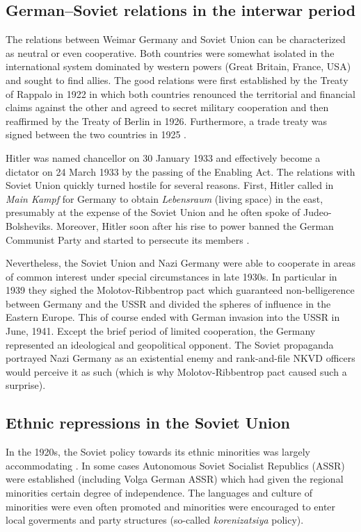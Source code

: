 \subsection{German–Soviet relations in the interwar period}
The relations between Weimar Germany and Soviet Union can be characterized as neutral or even cooperative. Both countries were somewhat isolated in the international system dominated by western powers (Great Britain, France, USA) and sought to find allies. The good relations were first established by the Treaty of Rappalo in 1922 in which both countries renounced the territorial and financial claims against the other and agreed to secret military cooperation \citep{gatzke_russo-german_1958} and then reaffirmed by the Treaty of Berlin in 1926. Furthermore, a trade treaty was signed between the two countries in 1925 \citep{morgan_political_1963}.

Hitler was named chancellor on 30 January 1933 and effectively become a dictator on 24 March 1933 by the passing of the Enabling Act. 
The relations with Soviet Union quickly turned hostile for several reasons.  First, Hitler called in \emph{Main Kampf} for Germany to obtain \emph{Lebensraum} (living space) in the east, presumably at the expense of the Soviet Union and he often spoke of Judeo-Bolsheviks. Moreover, Hitler soon after his rise to power banned the German Communist Party and started to persecute its members  \citep{haslam_soviet_1984}. 

Nevertheless, the Soviet Union and Nazi Germany were able to cooperate in areas of common interest under special circumstances in late 1930s. In particular in 1939 they sighed the  Molotov-Ribbentrop pact which guaranteed non-belligerence between Germany and the USSR and divided the spheres of influence in the Eastern Europe. This of course ended with German invasion into the USSR in June, 1941.  
Except the brief period of limited cooperation, the Germany represented an ideological and geopolitical opponent. The Soviet propaganda portrayed Nazi Germany as an existential enemy and rank-and-file NKVD officers would perceive it as such (which is why Molotov-Ribbentrop pact caused such a surprise). 
\subsection{Ethnic repressions in the Soviet Union}
In the 1920s, the Soviet policy towards its ethnic minorities was largely accommodating \citep{martin_affirmative_2001}. In some cases Autonomous Soviet Socialist Republics (ASSR) were established (including Volga German ASSR) which had given the regional minorities certain degree of independence. The languages and culture of minorities were even often promoted and minorities were encouraged to enter local goverments and party structures (so-called \emph{korenizatsiya} policy). 

